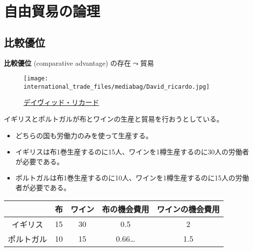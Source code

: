 \documentclass[
  xelatex,
  ja=standard]{bxjsarticle}
\providecommand{\tightlist}{%
  \setlength{\itemsep}{0pt}\setlength{\parskip}{0pt}}\usepackage{longtable,booktabs,array}
\begin{document}
\hypertarget{ux81eaux7531ux8cbfux6613ux306eux8ad6ux7406}{%
\section{自由貿易の論理}\label{ux81eaux7531ux8cbfux6613ux306eux8ad6ux7406}}

\hypertarget{ux6bd4ux8f03ux512aux4f4d}{%
\subsection{比較優位}\label{ux6bd4ux8f03ux512aux4f4d}}

\textbf{比較優位} (comparative advantage) の存在\(\leadsto\)貿易

\begin{figure}[htpb]

{\centering \texttt{[image: international\_trade\_files/mediabag/David\_ricardo.jpg]}

}

\caption{\href{https://commons.wikimedia.org/wiki/File:David_ricardo.jpg}{デイヴィッド・リカード}}

\end{figure}

\begin{tcolorbox}[enhanced jigsaw, toprule=.15mm, leftrule=.75mm, coltitle=black, opacityback=0, colback=white, title=\textcolor{quarto-callout-tip-color}{\faLightbulb}\hspace{0.5em}{イギリスとポルトガルの貿易}, rightrule=.15mm, bottomrule=.15mm, colbacktitle=quarto-callout-tip-color!10!white, opacitybacktitle=0.6, titlerule=0mm, colframe=quarto-callout-tip-color-frame, bottomtitle=1mm, toptitle=1mm, arc=.35mm, left=2mm, breakable]

イギリスとポルトガルが布とワインの生産と貿易を行おうとしている。

\begin{itemize}
\tightlist
\item
  どちらの国も労働力のみを使って生産する。
\item
  イギリスは布1巻生産するのに15人、ワインを1樽生産するのに30人の労働者が必要である。
\item
  ポルトガルは布1巻生産するのに10人、ワインを1樽生産するのに15人の労働者が必要である。
\end{itemize}

\end{tcolorbox}

\begin{longtable}[]{@{}ccccc@{}}
\toprule\noalign{}
& 布 & ワイン & 布の機会費用 & ワインの機会費用 \\
\midrule\noalign{}
\endhead
\bottomrule\noalign{}
\endlastfoot
イギリス & 15 & 30 & 0.5 & 2 \\
ポルトガル & 10 & 15 & 0.66\ldots{} & 1.5 \\
\end{longtable}
\end{document}
